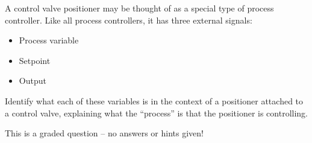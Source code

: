 

A control valve positioner may be thought of as a special type of process controller.  Like all process controllers, it has three external signals:

\begin{itemize}
\item{} Process variable
\item{} Setpoint
\item{} Output
\end{itemize}

Identify what each of these variables is in the context of a positioner attached to a control valve, explaining what the ``process'' is that the positioner is controlling.

\vfil

\eject






This is a graded question -- no answers or hints given!













